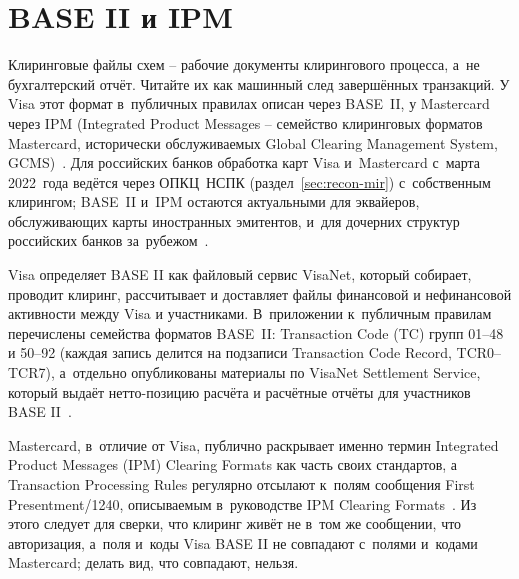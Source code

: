 \section{BASE II и IPM}\label{sec:recon-base2-ipm}

Клиринговые файлы схем -- рабочие документы клирингового процесса,
а~не бухгалтерский отчёт. Читайте их как машинный след
завершённых транзакций. У Visa этот формат в~публичных правилах
описан через BASE~II, у Mastercard через IPM (Integrated Product
Messages -- семейство клиринговых форматов Mastercard, исторически
обслуживаемых Global Clearing Management System,
GCMS)~\cite{visa-core-rules,mc-pfmi-disclosure,mc-switching-services}.
Для российских банков обработка карт Visa и~Mastercard с~марта 2022~года ведётся через ОПКЦ~НСПК (раздел~\ref{sec:recon-mir}) с~собственным клирингом; BASE~II и~IPM остаются актуальными для эквайеров, обслуживающих карты иностранных эмитентов, и~для дочерних структур российских банков за~рубежом~\cite{cbr-ps,nspk-mir-rules}.

Visa определяет BASE II как файловый сервис VisaNet, который собирает,
проводит клиринг, рассчитывает и доставляет файлы финансовой и нефинансовой
активности между Visa и участниками. В~приложении к~публичным правилам
перечислены семейства форматов BASE~II: Transaction Code (TC) групп
01--48 и 50--92 (каждая запись делится на подзаписи Transaction Code
Record, TCR0--TCR7), а~отдельно опубликованы материалы по VisaNet
Settlement Service,
который выдаёт нетто-позицию расчёта и расчётные отчёты для участников
BASE II~\cite{visa-core-rules}.

Mastercard, в~отличие от Visa, публично раскрывает именно термин
Integrated Product Messages (IPM) Clearing Formats как часть своих
стандартов, а Transaction Processing Rules регулярно отсылают к~полям
сообщения First Presentment/1240, описываемым в~руководстве
IPM Clearing Formats~\cite{mc-pfmi-disclosure,mc-tpr}. Из этого следует
для сверки, что клиринг живёт не в~том же сообщении, что авторизация,
а~поля и~коды Visa BASE II не совпадают с~полями и~кодами Mastercard;
делать вид, что совпадают, нельзя.

